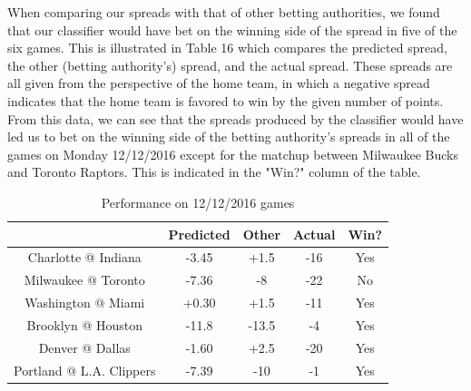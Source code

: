 \documentclass{article}
\begin{document}
When comparing our spreads with that of other betting authorities, we found that our classifier would have bet on the winning side of the spread in five of the six games. This is illustrated in Table 16 which compares the predicted spread, the other (betting authority's) spread, and the actual spread. These spreads are all given from the perspective of the home team, in which a negative spread indicates that the home team is favored to win by the given number of points. From this data, we can see that the spreads produced by the classifier would have led us to bet on the winning side of the betting authority's spreads in all of the games on Monday 12/12/2016 except for the matchup between Milwaukee Bucks and Toronto Raptors. This is indicated in the "Win?" column of the table.


\begin{table}
  \begin{center}
    \begin{tabular}{ | c | c | c | c | c | }
      \hline
                                & Predicted     & Other  & Actual & Win?  \\ \hline
      Charlotte @ Indiana       & -3.45         & +1.5   & -16    & Yes   \\ \hline
      Milwaukee @ Toronto       & -7.36         & -8     & -22    & No   \\ \hline
      Washington @ Miami        & +0.30         & +1.5   & -11    & Yes    \\ \hline
      Brooklyn @ Houston        & -11.8         & -13.5  & -4     & Yes   \\ \hline
      Denver @ Dallas           & -1.60         & +2.5   & -20    & Yes   \\ \hline
      Portland @ L.A. Clippers  & -7.39         & -10    & -1     & Yes   \\ \hline
    \end{tabular}
  \end{center}
  \caption{Performance on 12/12/2016 games}
\end{table}
\end{document}
